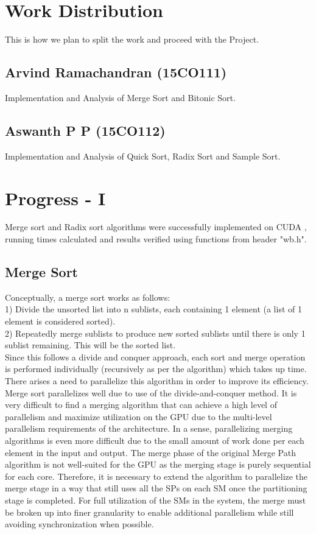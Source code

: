 \documentclass[conference]{IEEEtran}
\begin{document}
\section{Work Distribution}
This is how we plan to split the work and proceed with the Project.
\subsection{Arvind Ramachandran (15CO111)}
Implementation and Analysis of Merge Sort and Bitonic Sort.
\subsection{Aswanth P P (15CO112)}
Implementation and Analysis of Quick Sort, Radix Sort and Sample Sort.

\section{Progress - I}
Merge sort and Radix sort algorithms were successfully implemented on CUDA , running times calculated and results verified using functions from header "wb.h".

\subsection{Merge Sort}
Conceptually, a merge sort works as follows:   \\1) Divide the unsorted list into n sublists, each containing 1 element (a list of 1 element is considered sorted).\\
   2) Repeatedly merge sublists to produce new sorted sublists until there is only 1 sublist remaining. This will be the sorted list.\\
   
   Since this follows a divide and conquer approach, each sort and merge operation is performed individually (recursively as per the algorithm)
 which takes up time. There arises a need to parallelize this algorithm in order to improve its efficiency. Merge sort parallelizes well due to use of the divide-and-conquer method. It is very difficult to find a merging algorithm that can achieve
a high level of parallelism and maximize utilization on the GPU due to the multi-level parallelism requirements of the
architecture. In a sense, parallelizing merging algorithms is
even more difficult due to the small amount of work done
per each element in the input and output. The merge phase
of the original Merge Path algorithm is not well-suited for
the GPU as the merging stage is purely sequential for each
core. Therefore, it is necessary to extend the algorithm to
parallelize the merge stage in a way that still uses all the
SPs on each SM once the partitioning stage is completed. For full utilization of the SMs in the system, the merge
must be broken up into finer granularity to enable additional
parallelism while still avoiding synchronization when possible. \\
\end{document}

